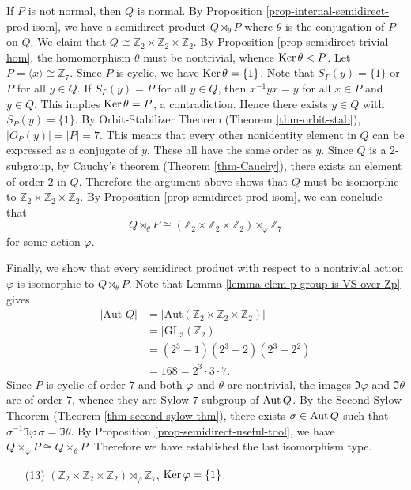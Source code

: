 \begin{example}
	If $P$ is not normal, then $Q$ is normal. By Proposition \ref{prop-internal-semidirect-prod-isom},  we have a semidirect product $Q\rtimes_{\theta} P$ where $\theta$ is the conjugation of $P$ on $Q$. We  claim that $Q\cong \mathbb{Z}_2\times\mathbb{Z}_2\times\mathbb{Z}_2$.  By Proposition \ref{prop-semidirect-trivial-hom},   the homomorphism $\theta$ must be nontrivial, whence $\operatorname{Ker} \theta < P$.  Let $P = \langle x\rangle\cong\mathbb{Z}_7$. Since $P$ is cyclic, we have $\operatorname{Ker} \theta = \{1\}$. Note that $S_P(y) = \{1\}$ or $P$ for all $y\in Q$. If $S_P(y) = P$ for all $y\in Q$, then $x^{-1}yx = y$ for all $x\in P$ and $y\in Q$. This implies $\operatorname{Ker}  \theta = P$, a contradiction. Hence there exists $y\in Q$ with $S_P(y) = \{1\}$. By Orbit-Stabilizer Theorem (Theorem \ref{thm-orbit-stab}), $|O_P(y)| = |P| = 7$. This means that every other nonidentity element in $Q$ can be expressed as a conjugate of $y$. These all have the same order as $y$. Since $Q$ is a $2$-subgroup, by Cauchy's theorem (Theorem \ref{thm-Cauchy}), there exists an element of order $2$ in $Q$. Therefore the argument above shows that $Q$ must be isomorphic to $\mathbb{Z}_2\times\mathbb{Z}_2\times\mathbb{Z}_2$. By Proposition \ref{prop-semidirect-prod-isom}, we can conclude that 
	\begin{equation*}
		Q\rtimes_{\theta} P \cong (\mathbb{Z}_2\times\mathbb{Z}_2\times\mathbb{Z}_2) \rtimes_{\varphi} \mathbb{Z}_7
	\end{equation*}
	for some  action $\varphi$.
	
	Finally, we show that every semidirect product  with respect to a nontrivial action $\varphi$ is isomorphic to $ Q\rtimes_{\theta} P$. Note that Lemma \ref{lemma-elem-p-group-is-VS-over-Zp} gives
	\begin{align*}
		|\text{Aut } Q| &=|\text{Aut} (\mathbb{Z}_2\times\mathbb{Z}_2\times\mathbb{Z}_2)| 
		\\
		&= |\text{GL}_3(\mathbb{Z}_2)| 
		\\
		&= (2^3-1)(2^3-2)(2^3-2^2) 
		\\
		&= 168 = 2^3\cdot 3\cdot 7.
	\end{align*}  Since $P$ is cyclic of order $7$ and both $\varphi$ and $\theta$ are nontrivial, the images $\Im  \varphi$ and $\Im  \theta$ are of order $7$, whence they are Sylow $7$-subgroup of $\operatorname{Aut}  Q$. By the Second Sylow Theorem (Theorem \ref{thm-second-sylow-thm}), there exists $\sigma\in \operatorname{Aut}  Q$ such that $\sigma^{-1} \Im  \varphi \, \sigma=\Im  \theta$. By Proposition \ref{prop-semidirect-useful-tool}, we have $Q\times_{\varphi} P \cong Q\times_{\theta} P$. Therefore we have established the last isomorphism type.
	\begin{itemize}
		\item[(13)] $(\mathbb{Z}_2\times\mathbb{Z}_2\times\mathbb{Z}_2) \rtimes_{\varphi} \mathbb{Z}_7$, $\operatorname{Ker}\varphi = \{1\}$.
	\end{itemize}
\end{example}


